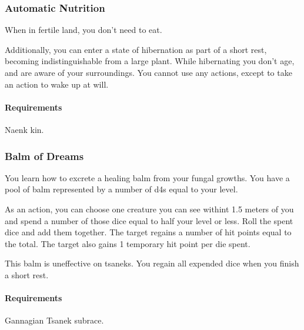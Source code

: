\subsubsection{Automatic Nutrition} \label{feat::automaticnutrition}
    When in fertile land, you don't need to eat.

    Additionally, you can enter a state of hibernation as part of a short rest, becoming indistinguishable from a large plant.
    While hibernating you don't age, and are aware of your surroundings.
    You cannot use any actions, except to take an action to wake up at will.
    \paragraph{Requirements} Naenk kin.
\subsubsection{Balm of Dreams} \label{feat::balmofdreams}
    You learn how to excrete a healing balm from your fungal growths.
    You have a pool of balm represented by a number of d4s equal to your level.

    As an action, you can choose one creature you can see withint 1.5 meters of you and spend a number of those dice equal to half your level or less.
    Roll the spent dice and add them together.
    The target regains a number of hit points equal to the total.
    The target also gains 1 temporary hit point per die spent.

    This balm is uneffective on tsaneks.
    You regain all expended dice when you finish a short rest.
    \paragraph{Requirements} Gannagian Tsanek subrace.

